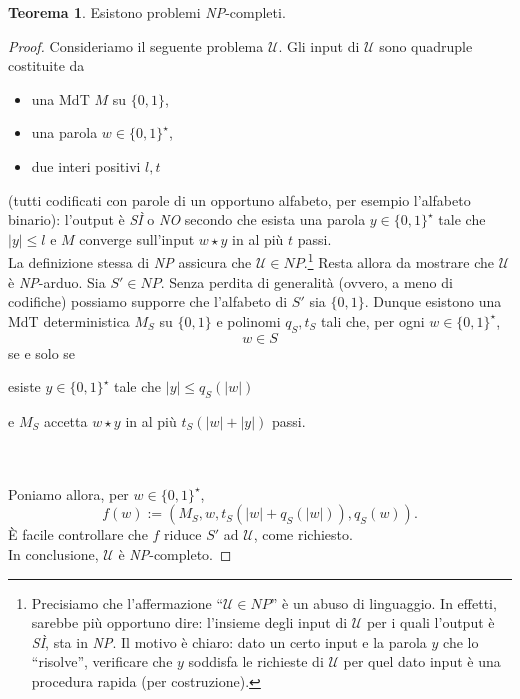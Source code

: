 \documentclass[12pt,a4paper]{report}
\theoremstyle{definition}
\newtheorem{teo}{Teorema}[section]  %
\begin{document}
\begin{teo}
Esistono problemi \emph{NP}-completi.
\begin{proof}
Consideriamo il seguente problema $\mathcal{U}$. Gli input di $\mathcal{U}$ sono quadruple costituite da 
\begin{itemize}
\item una MdT $M$ su $\{0,1\}$,
\item una parola $w \in \{0,1\}^{\star}$,
\item due interi positivi $l,t$
\end{itemize}
(tutti codificati con parole di un opportuno alfabeto, per esempio l'alfabeto binario): l'output è \emph{SÌ} o \emph{NO} secondo che esista una parola $y \in \{0,1\}^{\star}$ tale che $|y| \leq l$ e $M$ converge sull'input $w \star y$ in al più $t$ passi.\\
La definizione stessa di \emph{NP} assicura che $\mathcal{U} \in NP$.\footnote{Precisiamo che l'affermazione ``$\mathcal{U} \in NP$'' è un abuso di linguaggio. In effetti, sarebbe più opportuno dire: l'insieme degli input di $\mathcal{U}$ per i quali l'output è \emph{SÌ}, sta in \emph{NP}. Il motivo è chiaro: dato un certo input e la parola $y$ che lo ``risolve'', verificare che $y$ soddisfa le richieste di $\mathcal{U}$ per quel dato input è una procedura rapida (per costruzione).}
Resta allora da mostrare che $\mathcal{U}$ è \emph{NP}-arduo. Sia $S' \in NP$. Senza perdita di generalità (ovvero, a meno di codifiche) possiamo supporre che l'alfabeto di $S'$ sia $\{0,1\}$. Dunque esistono una MdT deterministica $M_S$ su $\{0,1\}$ e polinomi $q_S, t_S$ tali che, per ogni $w \in \{0,1\}^{\star}$,
$$w \in S$$
se e solo se\\
\centerline{esiste $y \in \{0,1\}^{\star}$ tale che $|y| \leq q_S(|w|)$}
\centerline{e $M_S$ accetta $w \star y$ in al più $t_S(|w|+|y|)$ passi.}\\
\\
Poniamo allora, per $w \in \{0,1\}^{\star}$, 
$$f(w):=(M_S, w, t_S(|w|+q_S(|w|)), q_S(w)).$$
È facile controllare che $f$ riduce $S'$ ad $\mathcal{U}$, come richiesto.\\
In conclusione, $\mathcal{U}$ è \emph{NP}-completo.
\end{proof}
\end{teo}
\end{document}
